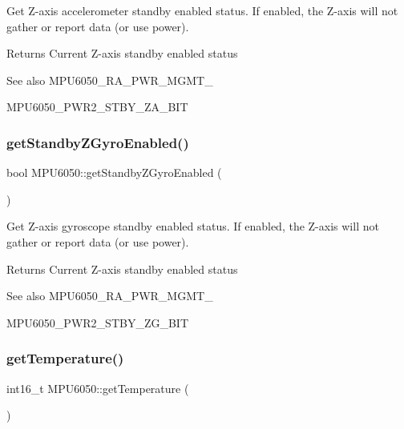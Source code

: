 Get Z-\/axis accelerometer standby enabled status. If enabled, the Z-\/axis will not gather or report data (or use power). \begin{DoxyReturn}{Returns}
Current Z-\/axis standby enabled status 
\end{DoxyReturn}
\begin{DoxySeeAlso}{See also}
M\+P\+U6050\+\_\+\+R\+A\+\_\+\+P\+W\+R\+\_\+\+M\+G\+M\+T\+\_ 

M\+P\+U6050\+\_\+\+P\+W\+R2\+\_\+\+S\+T\+B\+Y\+\_\+\+Z\+A\+\_\+\+B\+IT 
\end{DoxySeeAlso}
\mbox{\label{class_m_p_u6050_a20f7804db1a980a3c425ae44c33d420b}} 
\subsubsection{\texorpdfstring{getStandbyZGyroEnabled()}{getStandbyZGyroEnabled()}}
{\footnotesize\ttfamily bool M\+P\+U6050\+::get\+Standby\+Z\+Gyro\+Enabled (\begin{DoxyParamCaption}{ }\end{DoxyParamCaption})}

Get Z-\/axis gyroscope standby enabled status. If enabled, the Z-\/axis will not gather or report data (or use power). \begin{DoxyReturn}{Returns}
Current Z-\/axis standby enabled status 
\end{DoxyReturn}
\begin{DoxySeeAlso}{See also}
M\+P\+U6050\+\_\+\+R\+A\+\_\+\+P\+W\+R\+\_\+\+M\+G\+M\+T\+\_ 

M\+P\+U6050\+\_\+\+P\+W\+R2\+\_\+\+S\+T\+B\+Y\+\_\+\+Z\+G\+\_\+\+B\+IT 
\end{DoxySeeAlso}
\mbox{\label{class_m_p_u6050_aedfa4f1e6507f48c0a09545345a87875}} 
\subsubsection{\texorpdfstring{getTemperature()}{getTemperature()}}
{\footnotesize\ttfamily int16\+\_\+t M\+P\+U6050\+::get\+Temperature (\begin{DoxyParamCaption}{ }\end{DoxyParamCaption})}

